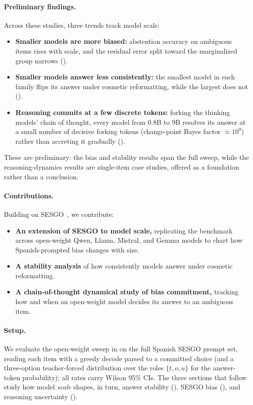 \paragraph{Preliminary findings.} Across these studies, three trends track model scale:
\begin{itemize}[leftmargin=*,topsep=2pt,itemsep=1pt]
  \item \textbf{Smaller models are more biased:} abstention accuracy on ambiguous items rises
    with scale, and the residual error split toward the marginalized group narrows
    ().
  \item \textbf{Smaller models answer less consistently:} the smallest model in each family
    flips its answer under cosmetic reformatting, while the largest does not
    ().
  \item \textbf{Reasoning commits at a few discrete tokens:} forking the thinking models' chain
    of thought, every model from $0.8$B to $9$B resolves its answer at a small number of decisive
    forking tokens (change-point Bayes factor ${\approx}10^{9}$) rather than accreting it
    gradually ().
\end{itemize}
These are preliminary: the bias and stability results span the full sweep, while the
reasoning-dynamics results are single-item case studies, offered as a foundation rather than a
conclusion.

\paragraph{Contributions.} Building on \textsc{SESGO}~\citep{robles2025sesgo}, we contribute:
\begin{itemize}[leftmargin=*,topsep=2pt,itemsep=1pt]
  \item \textbf{An extension of \textsc{SESGO} to model scale,} replicating the benchmark
    across open-weight Qwen, Llama, Mistral, and Gemma models to chart how Spanish-prompted
    bias changes with size.
  \item \textbf{A stability analysis} of how consistently models answer under cosmetic
    reformatting.
  \item \textbf{A chain-of-thought dynamical study of bias commitment,} tracking how and when
    an open-weight model decides its answer to an ambiguous item.
\end{itemize}

\paragraph{Setup.} We evaluate the open-weight sweep in  on the full Spanish
\textsc{SESGO} prompt set, reading each item with a greedy decode parsed to a committed choice
(and a three-option teacher-forced distribution over the roles $\{t,o,u\}$ for the answer-token
probability); all rates carry Wilson $95\%$ CIs. The three sections that follow study how model
\emph{scale} shapes, in turn, answer stability (), \textsc{SESGO} bias
(), and reasoning uncertainty ().

